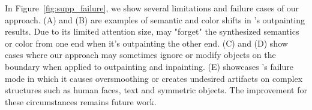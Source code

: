

\label{sec:supp_limitations}

In Figure~\ref{fig:supp_failure}, we show several limitations and failure cases of our approach. (A) and (B) are examples of semantic and color shifts in \model's outpainting results. Due to its limited attention size, \model may "forget" the synthesized semantics or color from one end when it's outpainting the other end. (C) and (D) show cases where our approach may sometimes ignore or modify objects on the boundary when applied to outpainting and inpainting. (E) showcases \model's failure mode in which it causes oversmoothing or creates undesired artifacts on complex structures such as human faces, text and symmetric objects. The improvement for these circumstances remains future work. 

